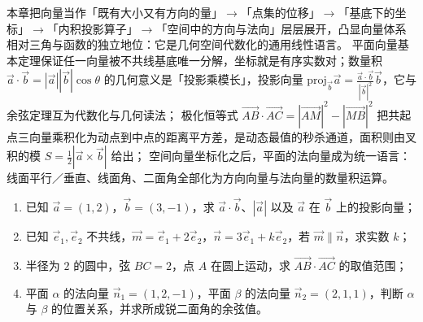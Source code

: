 \begin{explore}
\begin{summary}
本章把向量当作「既有大小又有方向的量」$\to$「点集的位移」$\to$「基底下的坐标」$\to$「内积投影算子」$\to$「空间中的方向与法向」层层展开，凸显向量体系相对三角与函数的独立地位：它是几何空间代数化的通用线性语言。
平面向量基本定理保证任一向量被不共线基底唯一分解，坐标就是有序实数对；数量积 $\vec a\cdot\vec b=|\vec a||\vec b|\cos\theta$ 的几何意义是「投影乘模长」，投影向量 $\mathrm{proj}_{\vec b}\vec a=\frac{\vec a\cdot\vec b}{|\vec b|^2}\vec b$，它与余弦定理互为代数化与几何读法；
极化恒等式 $\overrightarrow{AB}\cdot\overrightarrow{AC}=|\overrightarrow{AM}|^2-|\overrightarrow{MB}|^2$ 把共起点三向量乘积化为动点到中点的距离平方差，是动态最值的秒杀通道，面积则由叉积的模 $S=\frac12|\vec a\times\vec b|$ 给出；
空间向量坐标化之后，平面的法向量成为统一语言：线面平行／垂直、线面角、二面角全部化为方向向量与法向量的数量积运算。
\end{summary}

\end{explore}

\begin{inclasstest}
\begin{enumerate}
  \item 已知 $\vec a=(1,2)$，$\vec b=(3,-1)$，求 $\vec a\cdot\vec b$、$|\vec a|$ 以及 $\vec a$ 在 $\vec b$ 上的投影向量；
  \item 已知 $\vec e_1,\vec e_2$ 不共线，$\vec m=\vec e_1+2\vec e_2$，$\vec n=3\vec e_1+k\vec e_2$，若 $\vec m\parallel\vec n$，求实数 $k$；
  \item 半径为 $2$ 的圆中，弦 $BC=2$，点 $A$ 在圆上运动，求 $\overrightarrow{AB}\cdot\overrightarrow{AC}$ 的取值范围；
  \item 平面 $\alpha$ 的法向量 $\vec n_1=(1,2,-1)$，平面 $\beta$ 的法向量 $\vec n_2=(2,1,1)$，判断 $\alpha$ 与 $\beta$ 的位置关系，并求所成锐二面角的余弦值。
\end{enumerate}
\end{inclasstest}

